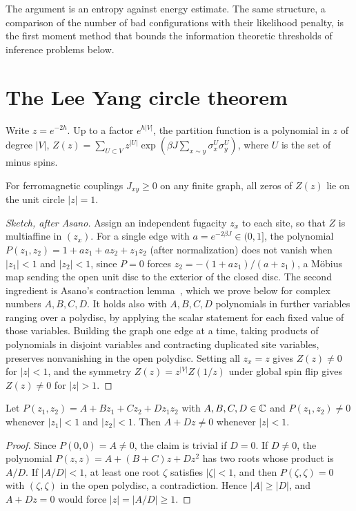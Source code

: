 The argument is an entropy against energy estimate. The same structure, a comparison of the number of bad configurations with their likelihood penalty, is the first moment method that bounds the information theoretic thresholds of inference problems below.

\section{The Lee Yang circle theorem}

Write $z = e^{-2h}$. Up to a factor $e^{h|V|}$, the partition function is a polynomial in $z$ of degree $|V|$, $Z(z) = \sum_{U\subset V}z^{|U|}\exp(\beta J\sum_{x\sim y}\sigma^U_x\sigma^U_y)$, where $U$ is the set of minus spins.

\begin{theorem}
For ferromagnetic couplings $J_{xy}\geq0$ on any finite graph, all zeros of $Z(z)$ lie on the unit circle $|z| = 1$.
\end{theorem}

\begin{proof}[Sketch, after Asano]
Assign an independent fugacity $z_x$ to each site, so that $Z$ is multiaffine in $(z_x)$. For a single edge with $a = e^{-2\beta J}\in(0,1]$, the polynomial $P(z_1,z_2) = 1+az_1+az_2+z_1z_2$ (after normalization) does not vanish when $|z_1|<1$ and $|z_2|<1$, since $P = 0$ forces $z_2 = -(1+az_1)/(a+z_1)$, a M\"obius map sending the open unit disc to the exterior of the closed disc. The second ingredient is Asano's contraction lemma~\cite{asano1970}, which we prove below for complex numbers $A,B,C,D$. It holds also with $A,B,C,D$ polynomials in further variables ranging over a polydisc, by applying the scalar statement for each fixed value of those variables. Building the graph one edge at a time, taking products of polynomials in disjoint variables and contracting duplicated site variables, preserves nonvanishing in the open polydisc. Setting all $z_x = z$ gives $Z(z)\neq0$ for $|z|<1$, and the symmetry $Z(z) = z^{|V|}Z(1/z)$ under global spin flip gives $Z(z)\neq0$ for $|z|>1$.
\end{proof}

\begin{lemma}[Asano]
Let $P(z_1,z_2) = A+Bz_1+Cz_2+Dz_1z_2$ with $A,B,C,D\in\mathbb{C}$ and $P(z_1,z_2)\neq0$ whenever $|z_1|<1$ and $|z_2|<1$. Then $A+Dz\neq0$ whenever $|z|<1$.
\end{lemma}

\begin{proof}
Since $P(0,0) = A\neq0$, the claim is trivial if $D = 0$. If $D\neq0$, the polynomial $P(z,z) = A+(B+C)z+Dz^2$ has two roots whose product is $A/D$. If $|A/D|<1$, at least one root $\zeta$ satisfies $|\zeta|<1$, and then $P(\zeta,\zeta) = 0$ with $(\zeta,\zeta)$ in the open polydisc, a contradiction. Hence $|A|\geq|D|$, and $A+Dz = 0$ would force $|z| = |A/D|\geq1$.
\end{proof}

